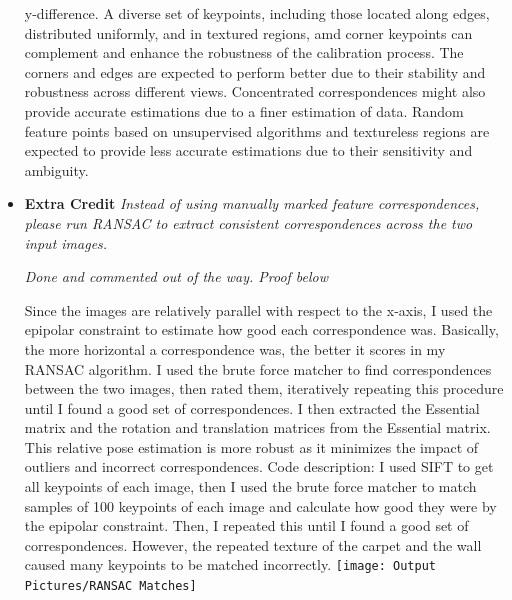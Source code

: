 \documentclass[11pt]{article}
\begin{document}
\begin{itemize}
        y-difference. A diverse set of keypoints, including those located along edges, distributed uniformly, and in
        textured regions, amd corner keypoints can complement and enhance the robustness of the calibration process.
        The corners and edges are expected to perform better due to their stability and robustness across different
        views. Concentrated correspondences might also provide accurate estimations due to a finer estimation of data.
        Random feature points based on unsupervised algorithms and textureless regions are expected to provide
        less accurate estimations due to their sensitivity and ambiguity.\newline

        \item \textbf{Extra Credit} \textit{Instead of using manually marked feature correspondences, please run
        RANSAC to extract consistent correspondences across the two input images.}
        \par
        \textit{\textemdash Done and commented out of the way. Proof below}
        \par
        Since the images are relatively parallel with respect to the x-axis, I used the epipolar constraint to
        estimate how good each correspondence was. Basically, the more horizontal a correspondence was, the better it
        scores in my RANSAC algorithm. I used the brute force matcher to find correspondences between the two
        images, then rated them, iteratively repeating this procedure until I found a good set of correspondences. I then
        extracted the Essential matrix and the rotation and translation matrices from the Essential matrix. This
        relative pose estimation is more robust as it minimizes the impact of outliers and incorrect correspondences.\newline
        Code description: I used SIFT to get all keypoints of each image, then I used the brute force matcher to
        match samples of 100 keypoints of each image and calculate how good they were by the epipolar constraint.
        Then, I repeated this until I found a good set of correspondences.\newline
        However, the repeated texture of the carpet and the wall caused many keypoints to be matched incorrectly.\newline
        \texttt{[image: Output Pictures/RANSAC Matches]}\newline
    \end{itemize}
\end{document}
